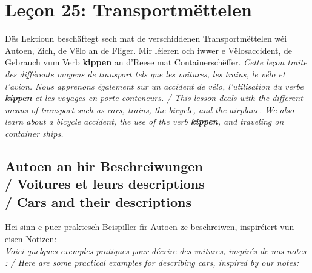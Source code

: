 \chapter{Leçon 25: Transportmëttelen}

Dës Lektioun beschäftegt sech mat de verschiddenen Transportmëttelen wéi Autoen, Zich, de Vëlo an de Fliger. Mir léieren och iwwer e Vëlosaccident, de Gebrauch vum Verb \textbf{kippen} an d'Reese mat Containerschëffer. \textit{Cette leçon traite des différents moyens de transport tels que les voitures, les trains, le vélo et l'avion. Nous apprenons également sur un accident de vélo, l'utilisation du verbe \textbf{kippen} et les voyages en porte-conteneurs. / This lesson deals with the different means of transport such as cars, trains, the bicycle, and the airplane. We also learn about a bicycle accident, the use of the verb \textbf{kippen}, and traveling on container ships.}

\vspace{1em}

\section[Autoen an hir Beschreiwungen / Voitures / Cars]{Autoen an hir Beschreiwungen \\/ Voitures et leurs descriptions \\/ Cars and their descriptions}

Hei sinn e puer praktesch Beispiller fir Autoen ze beschreiwen, inspiréiert vun eisen Notizen: \\
\textit{Voici quelques exemples pratiques pour décrire des voitures, inspirés de nos notes : / Here are some practical examples for describing cars, inspired by our notes:}

